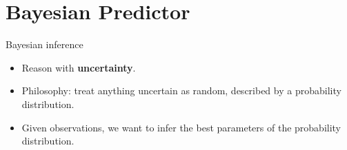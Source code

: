 \documentclass[usenames,dvipsnames]{beamer}
\begin{document}
\section{Bayesian Predictor}


\begin{frame}{Bayesian inference}

\begin{itemize}
\item Reason with \textbf{uncertainty}.
\bigskip
\item Philosophy: treat anything uncertain as random, described by a probability distribution.
\bigskip
\item Given observations, we want to infer the best parameters of the probability distribution.

\end{itemize}
\end{frame}
\end{document}
